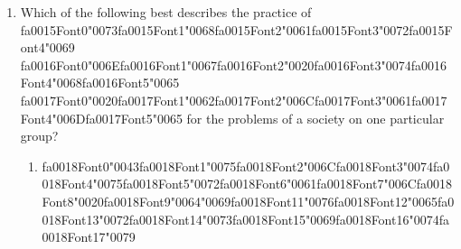 \documentclass[12pt]{article}
\begin{document}
\begin{enumerate}[label=\arabic*.]
\begin{enumerate}[label=(\alph*)]
    \item {\char"0061}{\csname fa0011Font1\endcsname\char"006E}{\csname fa0011Font2\endcsname\char"0020}{\csname fa0011Font3\endcsname\char"006F}{\csname fa0011Font4\endcsname\char"0070} {\csname fa0012Font0\endcsname\char"0065}{\csname fa0012Font1\endcsname\char"006E}{\csname fa0012Font2\endcsname\char"0020}{\csname fa0012Font3\endcsname\char"006D}{\csname fa0012Font4\endcsname\char"0061} {\csname fa0013Font0\endcsname\char"0072}{\csname fa0013Font1\endcsname\char"006B}{\csname fa0013Font2\endcsname\char"0065}{\csname fa0013Font3\endcsname\char"0074}{\csname fa0013Font4\endcsname\char"0020}{\csname fa0013Font5\endcsname\char"0065} {\csname fa0014Font0\endcsname\char"0063}{\char"006F}{\char"006E}{\char"006F}{\char"006D}{\char"0079}
\end{enumerate}
\item Which of the following best describes the practice of {\csname fa0015Font0\endcsname\char"0073}{\csname fa0015Font1\endcsname\char"0068}{\csname fa0015Font2\endcsname\char"0061}{\csname fa0015Font3\endcsname\char"0072}{\csname fa0015Font4\endcsname\char"0069} {\csname fa0016Font0\endcsname\char"006E}{\csname fa0016Font1\endcsname\char"0067}{\csname fa0016Font2\endcsname\char"0020}{\csname fa0016Font3\endcsname\char"0074}{\csname fa0016Font4\endcsname\char"0068}{\csname fa0016Font5\endcsname\char"0065} {\csname fa0017Font0\endcsname\char"0020}{\csname fa0017Font1\endcsname\char"0062}{\csname fa0017Font2\endcsname\char"006C}{\csname fa0017Font3\endcsname\char"0061}{\csname fa0017Font4\endcsname\char"006D}{\csname fa0017Font5\endcsname\char"0065} for the problems of a society on one particular group?
\begin{enumerate}[label=(\alph*)]
    \item {\csname fa0018Font0\endcsname\char"0043}{\csname fa0018Font1\endcsname\char"0075}{\csname fa0018Font2\endcsname\char"006C}{\csname fa0018Font3\endcsname\char"0074}{\csname fa0018Font4\endcsname\char"0075}{\csname fa0018Font5\endcsname\char"0072}{\csname fa0018Font6\endcsname\char"0061}{\csname fa0018Font7\endcsname\char"006C}{\csname fa0018Font8\endcsname\char"0020}{\csname fa0018Font9\endcsname\char"0064}{\char"0069}{\csname fa0018Font11\endcsname\char"0076}{\csname fa0018Font12\endcsname\char"0065}{\csname fa0018Font13\endcsname\char"0072}{\csname fa0018Font14\endcsname\char"0073}{\csname fa0018Font15\endcsname\char"0069}{\csname fa0018Font16\endcsname\char"0074}{\csname fa0018Font17\endcsname\char"0079}

\end{enumerate}
\end{enumerate}
\end{document}
